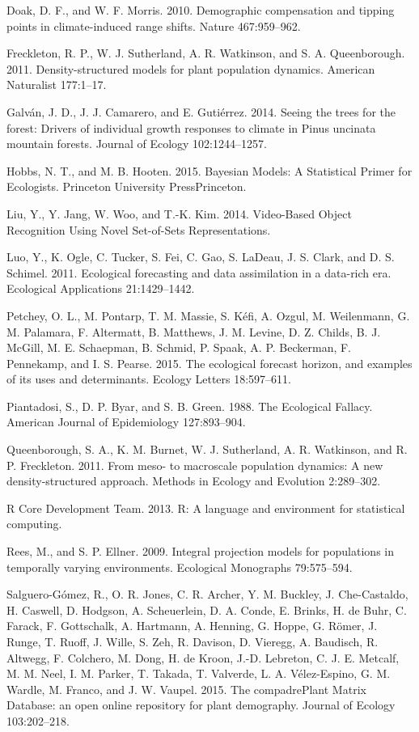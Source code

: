 \documentclass[12pt,]{article}
\begin{document}
Doak, D. F., and W. F. Morris. 2010. Demographic compensation and
tipping points in climate-induced range shifts. Nature 467:959--962.

Freckleton, R. P., W. J. Sutherland, A. R. Watkinson, and S. A.
Queenborough. 2011. Density-structured models for plant population
dynamics. American Naturalist 177:1--17.

Galván, J. D., J. J. Camarero, and E. Gutiérrez. 2014. Seeing the trees
for the forest: Drivers of individual growth responses to climate in
Pinus uncinata mountain forests. Journal of Ecology 102:1244--1257.

Hobbs, N. T., and M. B. Hooten. 2015. Bayesian Models: A Statistical
Primer for Ecologists. Princeton University PressPrinceton.

Liu, Y., Y. Jang, W. Woo, and T.-K. Kim. 2014. Video-Based Object
Recognition Using Novel Set-of-Sets Representations.

Luo, Y., K. Ogle, C. Tucker, S. Fei, C. Gao, S. LaDeau, J. S. Clark, and
D. S. Schimel. 2011. Ecological forecasting and data assimilation in a
data-rich era. Ecological Applications 21:1429--1442.

Petchey, O. L., M. Pontarp, T. M. Massie, S. Kéfi, A. Ozgul, M.
Weilenmann, G. M. Palamara, F. Altermatt, B. Matthews, J. M. Levine, D.
Z. Childs, B. J. McGill, M. E. Schaepman, B. Schmid, P. Spaak, A. P.
Beckerman, F. Pennekamp, and I. S. Pearse. 2015. The ecological forecast
horizon, and examples of its uses and determinants. Ecology Letters
18:597--611.

Piantadosi, S., D. P. Byar, and S. B. Green. 1988. The Ecological
Fallacy. American Journal of Epidemiology 127:893--904.

Queenborough, S. A., K. M. Burnet, W. J. Sutherland, A. R. Watkinson,
and R. P. Freckleton. 2011. From meso- to macroscale population
dynamics: A new density-structured approach. Methods in Ecology and
Evolution 2:289--302.

R Core Development Team. 2013. R: A language and environment for
statistical computing.

Rees, M., and S. P. Ellner. 2009. Integral projection models for
populations in temporally varying environments. Ecological Monographs
79:575--594.

Salguero-Gómez, R., O. R. Jones, C. R. Archer, Y. M. Buckley, J.
Che-Castaldo, H. Caswell, D. Hodgson, A. Scheuerlein, D. A. Conde, E.
Brinks, H. de Buhr, C. Farack, F. Gottschalk, A. Hartmann, A. Henning,
G. Hoppe, G. Römer, J. Runge, T. Ruoff, J. Wille, S. Zeh, R. Davison, D.
Vieregg, A. Baudisch, R. Altwegg, F. Colchero, M. Dong, H. de Kroon,
J.-D. Lebreton, C. J. E. Metcalf, M. M. Neel, I. M. Parker, T. Takada,
T. Valverde, L. A. Vélez-Espino, G. M. Wardle, M. Franco, and J. W.
Vaupel. 2015. The compadrePlant Matrix Database: an open online
repository for plant demography. Journal of Ecology 103:202--218.
\end{document}
